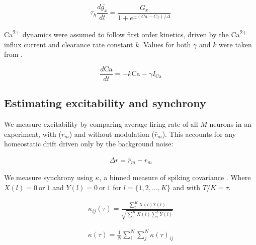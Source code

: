 \documentclass{article}
\begin{document}
\begin{equation}
\label{eq:dgdt}
\tau_h \frac{d \bar{g_x}}{dt} = \frac{G_x}{1 + e^{\pm (Ca - C_T)/\Delta}}
\end{equation}

Ca\textsuperscript{2+} dynamics were assumed to follow first order kinetics, driven by the Ca\textsuperscript{2+} influx current and clearance rate constant $k$. Values for both $\gamma$ and $k$ were taken from \cite{Liu1998}.

\begin{equation}
\frac{d\text{Ca}}{dt} = -k \text{Ca} - \gamma I_\text{Ca}
\end{equation}

\subsection*{Estimating excitability and synchrony}
We measure excitability by comparing average firing rate of all $M$ neurons in an experiment, with ($r_m$) and without modulation ($\bar{r}_m$). This accounts for any homeostatic drift driven only by the background noise:

\begin{align}
    \label{eq:excite}
    \Delta r = \bar{r}_m - r_m
\end{align}

We measure synchrony using $\kappa$, a binned measure of spiking covariance \cite{Wang1996}. Where $X(l) = 0 \ \text{or} \ 1$ and $Y(l) = 0 \ \text{or} \ 1$ for $l = \{1, 2, ..., K \}$ and with $T/K = \tau$.

\begin{align}
    \label{eq:kappa}
    \kappa_{ij}(\tau) = \frac{\sum_l^K X(l)Y(l)}{\sqrt{\sum_l^K X(l) \sum_l^k Y(l)}}
\end{align}

\begin{align}
\kappa(\tau) = \frac{1}{N} \sum_i^N \sum_j^N \kappa(\tau)_{ij}
\end{align}

\end{document}
